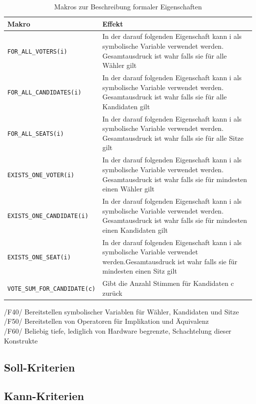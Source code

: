 \documentclass[a4paper]{scrreprt}
\begin{document}
\begin{table}[H]
\caption{Makros zur Beschreibung formaler Eigenschaften}
\begin{tabular}{|p{5cm}|p{10cm}|}
\hline 
Makro & Effekt \\
\hline 
\verb!FOR_ALL_VOTERS(i)! & In der darauf folgenden Eigenschaft kann i als symbolische Variable verwendet werden. Gesamtausdruck ist wahr falls sie für alle Wähler gilt \\
\hline 
\verb!FOR_ALL_CANDIDATES(i)! & In der darauf folgenden Eigenschaft kann i als symbolische Variable verwendet werden. Gesamtausdruck ist wahr falls sie für alle Kandidaten gilt \\
\hline 
\verb!FOR_ALL_SEATS(i)! & In der darauf folgenden Eigenschaft kann i als symbolische Variable verwendet werden. Gesamtausdruck ist wahr falls sie für alle Sitze gilt \\
\hline 
\verb!EXISTS_ONE_VOTER(i)! & In der darauf folgenden Eigenschaft kann i als symbolische Variable verwendet werden. Gesamtausdruck ist wahr falls sie für mindesten einen Wähler gilt \\
\hline 
\verb!EXISTS_ONE_CANDIDATE(i)! & In der darauf folgenden Eigenschaft kann i als symbolische Variable verwendet werden. Gesamtausdruck ist wahr falls sie für mindesten einen Kandidaten gilt \\
\hline 
\verb!EXISTS_ONE_SEAT(i)! & In der darauf folgenden Eigenschaft kann i als symbolische Variable verwendet werden.Gesamtausdruck ist wahr falls sie für mindesten einen Sitz gilt \\
\hline 
\verb!VOTE_SUM_FOR_CANDIDATE(c)! & Gibt die Anzahl Stimmen für Kandidaten c zurück\\
\hline 
\end{tabular}
\label{table:Macros_for_formal_Attributes}
\end{table}
/F40/ Bereitstellen symbolischer Variablen für Wähler, Kandidaten und Sitze \\
/F50/ Bereitstellen von Operatoren für Implikation und Äquivalenz \\
/F60/ Beliebig tiefe, lediglich von Hardware begrenzte, Schachtelung dieser Konstrukte \\

\subsection{Soll-Kriterien}

\subsection{Kann-Kriterien}
\end{document}
